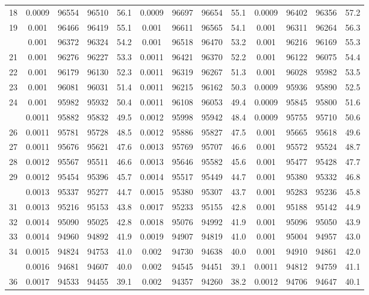 \documentclass[
  14pt,
]{article}
\begin{document}
\begin{longtable}[t]{lcccccccccccc}
18 & 0.0009 & 96554 & 96510 & 56.1 & 0.0009 & 96697 & 96654 & 55.1 & 0.0009 & 96402 & 96356 & 57.2\\
19 & 0.001 & 96466 & 96419 & 55.1 & 0.001 & 96611 & 96565 & 54.1 & 0.001 & 96311 & 96264 & 56.3\\
\addlinespace
20 & 0.001 & 96372 & 96324 & 54.2 & 0.001 & 96518 & 96470 & 53.2 & 0.001 & 96216 & 96169 & 55.3\\
21 & 0.001 & 96276 & 96227 & 53.3 & 0.0011 & 96421 & 96370 & 52.2 & 0.001 & 96122 & 96075 & 54.4\\
22 & 0.001 & 96179 & 96130 & 52.3 & 0.0011 & 96319 & 96267 & 51.3 & 0.001 & 96028 & 95982 & 53.5\\
23 & 0.001 & 96081 & 96031 & 51.4 & 0.0011 & 96215 & 96162 & 50.3 & 0.0009 & 95936 & 95890 & 52.5\\
24 & 0.001 & 95982 & 95932 & 50.4 & 0.0011 & 96108 & 96053 & 49.4 & 0.0009 & 95845 & 95800 & 51.6\\
\addlinespace
25 & 0.0011 & 95882 & 95832 & 49.5 & 0.0012 & 95998 & 95942 & 48.4 & 0.0009 & 95755 & 95710 & 50.6\\
26 & 0.0011 & 95781 & 95728 & 48.5 & 0.0012 & 95886 & 95827 & 47.5 & 0.001 & 95665 & 95618 & 49.6\\
27 & 0.0011 & 95676 & 95621 & 47.6 & 0.0013 & 95769 & 95707 & 46.6 & 0.001 & 95572 & 95524 & 48.7\\
28 & 0.0012 & 95567 & 95511 & 46.6 & 0.0013 & 95646 & 95582 & 45.6 & 0.001 & 95477 & 95428 & 47.7\\
29 & 0.0012 & 95454 & 95396 & 45.7 & 0.0014 & 95517 & 95449 & 44.7 & 0.001 & 95380 & 95332 & 46.8\\
\addlinespace
30 & 0.0013 & 95337 & 95277 & 44.7 & 0.0015 & 95380 & 95307 & 43.7 & 0.001 & 95283 & 95236 & 45.8\\
31 & 0.0013 & 95216 & 95153 & 43.8 & 0.0017 & 95233 & 95155 & 42.8 & 0.001 & 95188 & 95142 & 44.9\\
32 & 0.0014 & 95090 & 95025 & 42.8 & 0.0018 & 95076 & 94992 & 41.9 & 0.001 & 95096 & 95050 & 43.9\\
33 & 0.0014 & 94960 & 94892 & 41.9 & 0.0019 & 94907 & 94819 & 41.0 & 0.001 & 95004 & 94957 & 43.0\\
34 & 0.0015 & 94824 & 94753 & 41.0 & 0.002 & 94730 & 94638 & 40.0 & 0.001 & 94910 & 94861 & 42.0\\
\addlinespace
35 & 0.0016 & 94681 & 94607 & 40.0 & 0.002 & 94545 & 94451 & 39.1 & 0.0011 & 94812 & 94759 & 41.1\\
36 & 0.0017 & 94533 & 94455 & 39.1 & 0.002 & 94357 & 94260 & 38.2 & 0.0012 & 94706 & 94647 & 40.1\\

\end{longtable}
\end{document}
